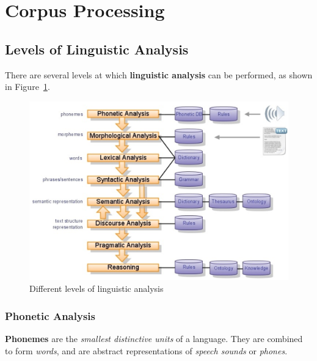 \section{Corpus Processing}
\subsection{Levels of Linguistic Analysis}
There are several levels at which \textbf{linguistic analysis} can be performed, as shown in Figure~\ref{fig:linguistic_analysis_levels}.
\begin{figure}[!hbtp]
	\centering
	\includegraphics[width=\textwidth]{img/linguistic_analysis_levels}
	\caption{Different levels of linguistic analysis}
	\label{fig:linguistic_analysis_levels}
\end{figure}


\subsubsection{Phonetic Analysis}
\begin{mydef}[Phoneme]
	\textbf{Phonemes} are the \emph{smallest distinctive units} of a language.
	They are combined to form \emph{words}, and are abstract representations of \emph{speech sounds} or \emph{phones}.
\end{mydef}

